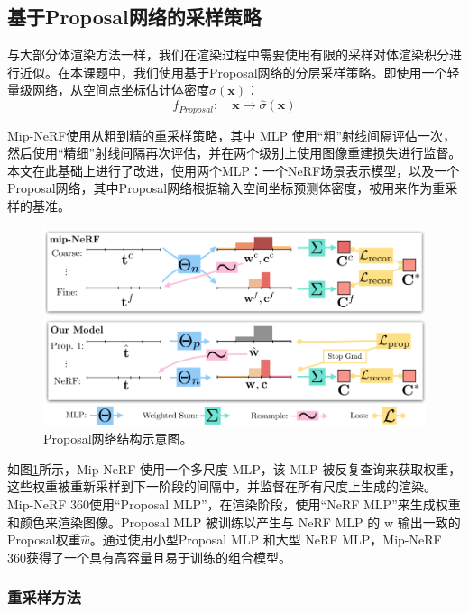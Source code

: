 \subsection{基于Proposal网络的采样策略}
与大部分体渲染方法一样，我们在渲染过程中需要使用有限的采样对体渲染积分进行近似。在本课题中，我们使用基于Proposal网络的分层采样策略。即使用一个轻量级网络，从空间点坐标估计体密度$\hat{\sigma}(\mathbf{x})$：
\begin{equation}
    f_{Proposal}:\quad \mathbf{x}\to\hat{\sigma}(\mathbf{x})
\end{equation}

Mip-NeRF\cite{barron_mip-nerf_2021}使用从粗到精的重采样策略，其中 MLP 使用“粗”射线间隔评估一次，然后使用“精细”射线间隔再次评估，并在两个级别上使用图像重建损失进行监督。本文在此基础上进行了改进，使用两个MLP：一个NeRF场景表示模型，以及一个Proposal网络，其中Proposal网络根据输入空间坐标预测体密度，被用来作为重采样的基准。

\begin{figure}[ht]
    \centering
    \includegraphics[width=\textwidth]{undergraduate-thesis/images/mip-nerf360 proposal network.png}
    \caption{Proposal网络结构示意图。}
    \label{fig:related-work proposal network}
\end{figure}

如图\ref{fig:related-work proposal network}所示，Mip-NeRF 使用一个多尺度 MLP，该 MLP 被反复查询来获取权重，这些权重被重新采样到下一阶段的间隔中，并监督在所有尺度上生成的渲染。Mip-NeRF 360使用“Proposal MLP”，在渲染阶段，使用“NeRF MLP”来生成权重和颜色来渲染图像。Proposal MLP 被训练以产生与 NeRF MLP 的 w 输出一致的Proposal权重$\hat{w}$。通过使用小型Proposal MLP 和大型 NeRF MLP，Mip-NeRF 360获得了一个具有高容量且易于训练的组合模型。

\subsubsection{重采样方法}

